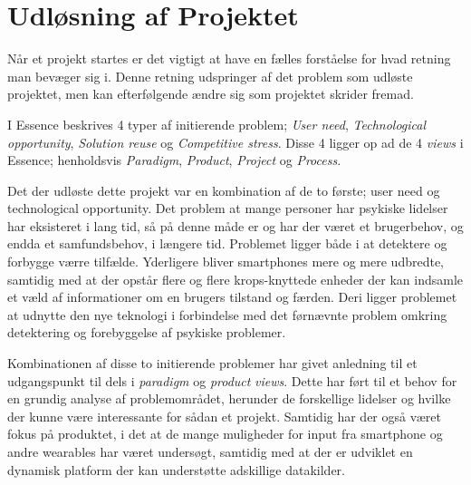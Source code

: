 \section{Udløsning af Projektet}
Når et projekt startes er det vigtigt at have en fælles forståelse for hvad retning man bevæger sig i.
Denne retning udspringer af det problem som udløste projektet, men kan efterfølgende ændre sig som projektet skrider fremad.

I Essence beskrives 4 typer af initierende problem; \textit{User need}, \textit{Technological opportunity}, \textit{Solution reuse} og \textit{Competitive stress}.
Disse 4 ligger op ad de 4 \textit{views} i Essence; henholdsvis \textit{Paradigm}, \textit{Product}, \textit{Project} og \textit{Process}.

Det der udløste dette projekt var en kombination af de to første; user need og technological opportunity.
Det problem at mange personer har psykiske lidelser har eksisteret i lang tid, så på denne måde er og har der været et brugerbehov, og endda et samfundsbehov, i længere tid.
Problemet ligger både i at detektere og forbygge værre tilfælde.
Yderligere bliver smartphones mere og mere udbredte, samtidig med at der opstår flere og flere krops-knyttede enheder der kan indsamle et væld af informationer om en brugers tilstand og færden.
Deri ligger problemet at udnytte den nye teknologi i forbindelse med det førnævnte problem omkring detektering og forebyggelse af psykiske problemer.

Kombinationen af disse to initierende problemer har givet anledning til et udgangspunkt til dels i \textit{paradigm} og \textit{product} \textit{views}.
Dette har ført til et behov for en grundig analyse af problemområdet, herunder de forskellige lidelser og hvilke der kunne være interessante for sådan et projekt.
Samtidig har der også været fokus på produktet, i det at de mange muligheder for input fra smartphone og andre wearables har været undersøgt, samtidig med at der er udviklet en dynamisk platform der kan understøtte adskillige datakilder.
